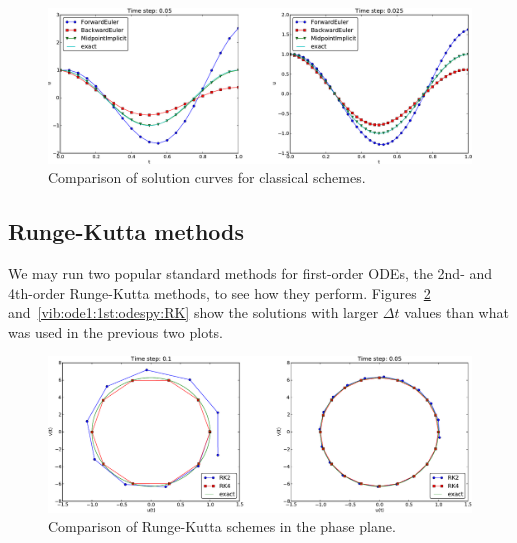 \documentclass[%
oneside,                 %
final,                   %
10pt]{article}
\begin{document}
\begin{figure}[!ht]  %
  \centerline{\includegraphics[width=1.0\linewidth]{fig-vib/vib_theta_1_u.pdf}}
  \caption{
  Comparison of solution curves for classical schemes. \label{vib:ode1:1st:odespy:theta}
  }
\end{figure}



\subsection{Runge-Kutta methods}

We may run two popular standard methods for first-order ODEs, the 2nd-
and 4th-order Runge-Kutta methods, to see how they perform. Figures~\ref{vib:ode1:1st:odespy:RK:phaseplane} and~\ref{vib:ode1:1st:odespy:RK} show the solutions with larger $\Delta
t$ values than what was used in the previous two plots.


\begin{figure}[!ht]  %
  \centerline{\includegraphics[width=1.0\linewidth]{fig-vib/vib_RK_1_pp.pdf}}
  \caption{
  Comparison of Runge-Kutta schemes in the phase plane. \label{vib:ode1:1st:odespy:RK:phaseplane}
  }
\end{figure}
\end{document}
